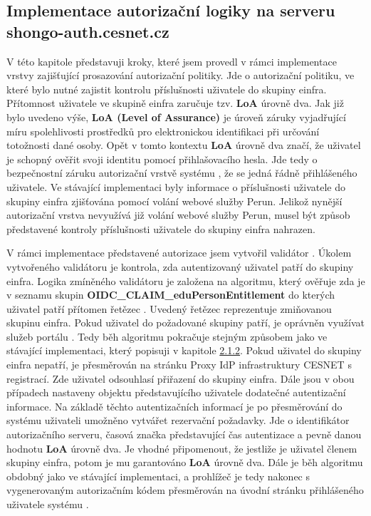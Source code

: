 \documentclass[
  printed, %
  twoside, %
  table,   %
  nolof,     %
  nolot,     %
]{fithesis3}
\begin{document}
\subsection[Implementace autorizační logiky na serveru\break shongo-auth.cesnet.cz]{Implementace autorizační logiky na serveru shongo-auth.cesnet.cz}
\label{ShongoImpl-authr}    
V této kapitole představuji kroky, které jsem provedl v rámci implementace vrstvy zajišťující prosazování autorizační politiky. Jde o autorizační politiku, ve které bylo nutné zajistit kontrolu příslušnosti uživatele do skupiny einfra. Přítomnost uživatele ve skupině einfra zaručuje tzv. \textbf{LoA} úrovně dva. Jak již bylo uvedeno výše, \textbf{LoA (Level of Assurance)} je úroveň záruky vyjadřující míru spolehlivosti prostředků pro elektronickou identifikaci při určování totožnosti dané osoby. Opět v tomto kontextu \textbf{LoA} úrovně dva značí, že uživatel je schopný ověřit svoji identitu pomocí přihlašovacího hesla. Jde tedy o bezpečnostní záruku autorizační vrstvě systému , že se jedná řádně přihlášeného uživatele. Ve stávající implementaci byly informace o příslušnosti uživatele do skupiny einfra zjišťována pomocí volání webové služby Perun. Jelikož nynější autorizační vrstva nevyužívá již volání webové služby Perun, musel být způsob představené kontroly příslušnosti uživatele do skupiny einfra nahrazen. 

\par

V rámci implementace představené autorizace jsem vytvořil validátor . Úkolem vytvořeného validátoru  je kontrola, zda autentizovaný uživatel patří do skupiny einfra. Logika zmíněného validátoru je založena na algoritmu, který ověřuje zda je v seznamu skupin \textbf{OIDC\_CLAIM\_eduPersonEntitlement} do kterých uživatel patří přítomen řetězec . Uvedený řetězec reprezentuje zmiňovanou skupinu einfra. Pokud uživatel do požadované skupiny patří, je oprávněn využívat služeb portálu . Tedy běh algoritmu pokračuje stejným způsobem jako ve stávající implementaci, který popisuji v kapitole \hyperref[meetings-old]{2.1.2}. Pokud uživatel do skupiny einfra nepatří, je přesměrován na stránku Proxy IdP infrastruktury CESNET s registrací. Zde uživatel odsouhlasí přiřazení do skupiny einfra. Dále jsou v obou případech nastaveny objektu představujícího uživatele dodatečné autentizační informace. Na základě těchto autentizačních informací je po přesměrování do systému  uživateli umožněno vytvářet rezervační požadavky. Jde o identifikátor autorizačního serveru, časová značka představující čas autentizace a pevně danou hodnotu \textbf{LoA} úrovně dva. Je vhodné připomenout, že jestliže je uživatel členem skupiny einfra, potom je mu garantováno \textbf{LoA} úrovně dva. Dále je běh algoritmu obdobný jako ve stávající implementaci, a prohlížeč je tedy nakonec s vygenerovaným autorizačním kódem přesměrován na úvodní stránku přihlášeného uživatele systému .
\end{document}
